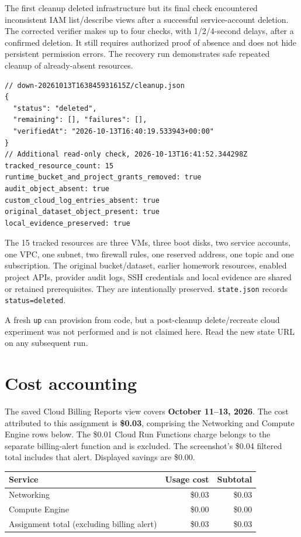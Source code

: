 \documentclass[11pt,letterpaper]{article}
\newcommand{\code}[1]{\texttt{\small #1}}
\newcommand{\newreportpage}[1]{\clearpage\section{#1}}
\begin{document}
The first cleanup deleted infrastructure but its final check encountered inconsistent IAM
list/describe views after a successful service-account deletion. The corrected verifier
makes up to four checks, with 1/2/4-second delays, after a confirmed deletion. It still
requires authorized proof of absence and does not hide persistent permission errors.
The recovery run demonstrates safe repeated cleanup of already-absent resources.

\begin{lstlisting}
// down-20261013T163845931615Z/cleanup.json
{
  "status": "deleted",
  "remaining": [], "failures": [],
  "verifiedAt": "2026-10-13T16:40:19.533943+00:00"
}
// Additional read-only check, 2026-10-13T16:41:52.344298Z
tracked_resource_count: 15
runtime_bucket_and_project_grants_removed: true
audit_object_absent: true
custom_cloud_log_entries_absent: true
original_dataset_object_present: true
local_evidence_preserved: true
\end{lstlisting}
The 15 tracked resources are three VMs, three boot disks, two service accounts, one VPC,
one subnet, two firewall rules, one reserved address, one topic and one subscription.
The original bucket/dataset, earlier homework resources, enabled project APIs, provider
audit logs, SSH credentials and local evidence are shared or retained prerequisites.
They are intentionally preserved. \code{state.json} records \code{status=deleted}.

A fresh \code{up} can provision from code, but a post-cleanup delete/recreate cloud experiment
was not performed and is not claimed here. Read the new state URL on any subsequent run.

\newreportpage{Cost accounting}
\label{sec:cost}
The saved Cloud Billing Reports view covers \textbf{October 11--13, 2026}. The cost
attributed to this assignment is \textbf{\$0.03}, comprising the Networking and Compute
Engine rows below. The \$0.01 Cloud Run Functions charge belongs to the separate billing-alert
function and is excluded. The screenshot's \$0.04 filtered total includes that alert.
Displayed savings are \$0.00.

\begin{tabularx}{\linewidth}{@{}Yrr@{}}\toprule
Service & Usage cost & Subtotal \\ \midrule
Networking & \$0.03 & \$0.03 \\
Compute Engine & \$0.00 & \$0.00 \\
\midrule
Assignment total (excluding billing alert) & \$0.03 & \$0.03 \\
\bottomrule\end{tabularx}
\end{document}
